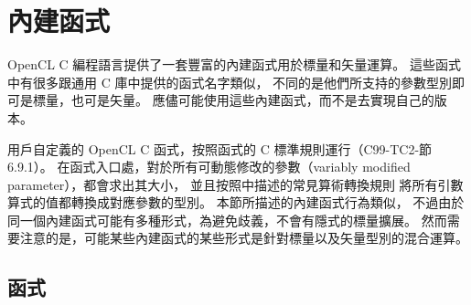 \section{內建函式}

OpenCL C 編程語言提供了一套豐富的內建函式用於標量和矢量運算。
這些函式中有很多跟通用 C 庫中提供的函式名字類似，
不同的是他們所支持的參數型別即可是標量，也可是矢量。
應儘可能使用這些內建函式，而不是去實現自己的版本。

用戶自定義的 OpenCL C 函式，按照函式的 C 標準規則運行（C99-TC2-節 6.9.1）。
在函式入口處，對於所有可動態修改的參數（variably modified parameter），都會求出其大小，
並且按照中描述的常見算術轉換規則
將所有引數算式的值都轉換成對應參數的型別。
本節所描述的內建函式行為類似，
不過由於同一個內建函式可能有多種形式，為避免歧義，不會有隱式的標量擴展。
然而需要注意的是，可能某些內建函式的某些形式是針對標量以及矢量型別的混合運算。

\subsection{函式}